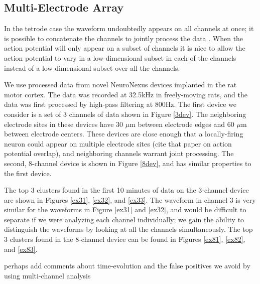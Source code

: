 \subsection{Multi-Electrode Array}
In the tetrode case the waveform undoubtedly appears on all channels at once; it is possible to concatenate the channels to jointly process the data \cite{wood2009}.  When the action potential will only appear on a subset of channels it is nice to allow the action potential to vary in a low-dimensional subset in each of the channels instead of a low-dimensional subset over all the channels. \cite{Prentice2011}

We use processed data from novel NeuroNexus devices implanted in the rat motor cortex.  The data was recorded at 32.5kHz in freely-moving rats, and the data was first processed by high-pass filtering at 800Hz.  The first device we consider is a set of 3 channels of data shown in Figure \ref{3dev}.  The neighboring electrode sites in these devices have 30 $\mu$m between electrode edges and 60 $\mu$m between electrode centers.  These devices are close enough that a locally-firing neuron could appear on multiple electrode sites (cite that paper on action potential overlap), and neighboring channels warrant joint processing.  The second, 8-channel device is shown in Figure \ref{8dev}, and has similar properties to the first device.

 The top 3 clusters found in the first 10 minutes of data on the 3-channel device are shown in Figures \ref{ex31}, \ref{ex32}, and \ref{ex33}.  The waveform in channel 3 is very similar for the waveforms in Figure \ref{ex31} and \ref{ex32}, and would be difficult to separate if we were analyzing each channel individually; we gain the ability to distinguish the waveforms by looking at all the channels simultaneously.  The top 3 clusters found in the 8-channel device can be found in Figures \ref{ex81}, \ref{ex82}, and \ref{ex83}.

{\color{red} perhaps add comments about time-evolution and the false positives we avoid by using multi-channel analysis}



